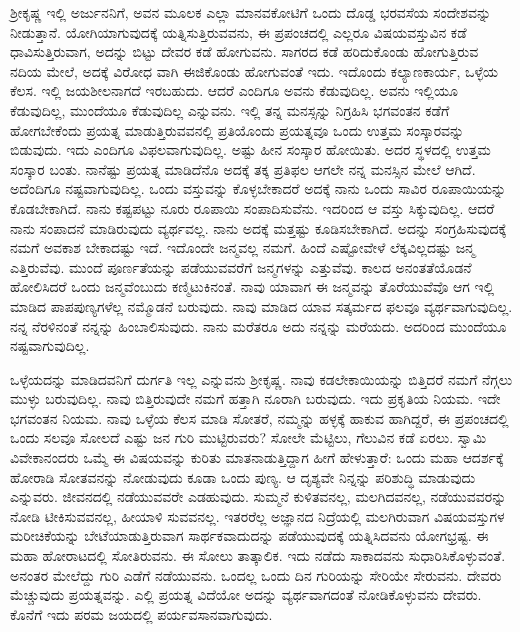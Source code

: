 ಶ್ರೀಕೃಷ್ಣ ಇಲ್ಲಿ ಅರ್ಜುನನಿಗೆ, ಅವನ ಮೂಲಕ ಎಲ್ಲಾ ಮಾನವಕೋಟಿಗೆ ಒಂದು ದೊಡ್ಡ ಭರವಸೆಯ ಸಂದೇಶವನ್ನು ನೀಡುತ್ತಾನೆ. ಯೋಗಿಯಾಗುವುದಕ್ಕೆ ಯತ್ನಿಸುತ್ತಿರುವವನು, ಈ ಪ್ರಪಂಚದಲ್ಲಿ ಎಲ್ಲರೂ ವಿಷಯವಸ್ತುವಿನ ಕಡೆ ಧಾವಿಸುತ್ತಿರುವಾಗ, ಅದನ್ನು ಬಿಟ್ಟು ದೇವರ ಕಡೆ ಹೋಗುವನು. ಸಾಗರದ ಕಡೆ ಹರಿದುಕೊಂಡು ಹೋಗುತ್ತಿರುವ ನದಿಯ ಮೇಲೆ, ಅದಕ್ಕೆ ವಿರೋಧ ವಾಗಿ ಈಜಿಕೊಂಡು ಹೋಗುವಂತೆ ಇದು. ಇದೊಂದು ಕಲ್ಯಾಣಕಾರ್ಯ, ಒಳ್ಳೆಯ ಕೆಲಸ. ಇಲ್ಲಿ ಜಯಶೀಲನಾಗದೆ ಇರಬಹುದು. ಆದರೆ ಎಂದಿಗೂ ಅವನು ಕೆಡುವುದಿಲ್ಲ. ಅವನು ಇಲ್ಲಿಯೂ ಕೆಡುವುದಿಲ್ಲ, ಮುಂದೆಯೂ ಕೆಡುವುದಿಲ್ಲ ಎನ್ನುವನು. ಇಲ್ಲಿ ತನ್ನ ಮನಸ್ಸನ್ನು ನಿಗ್ರಹಿಸಿ ಭಗವಂತನ ಕಡೆಗೆ ಹೋಗಬೇಕೆಂದು ಪ್ರಯತ್ನ ಮಾಡುತ್ತಿರುವವನಲ್ಲಿ ಪ್ರತಿಯೊಂದು ಪ್ರಯತ್ನವೂ ಒಂದು ಉತ್ತಮ ಸಂಸ್ಕಾರವನ್ನು ಬಿಡುವುದು. ಇದು ಎಂದಿಗೂ ವಿಫಲವಾಗುವುದಿಲ್ಲ. ಅಷ್ಟು ಹೀನ ಸಂಸ್ಕಾರ ಹೋಯಿತು. ಅದರ ಸ್ಥಳದಲ್ಲಿ ಉತ್ತಮ ಸಂಸ್ಕಾರ ಬಂತು. ನಾನೆಷ್ಟು ಪ್ರಯತ್ನ ಮಾಡಿದೆನೊ ಅದಕ್ಕೆ ತಕ್ಕ ಪ್ರತಿಫಲ ಆಗಲೇ ನನ್ನ ಮನಸ್ಸಿನ ಮೇಲೆ ಆಗಿದೆ. ಅದೆಂದಿಗೂ ನಷ್ಟವಾಗುವುದಿಲ್ಲ. ಒಂದು ವಸ್ತುವನ್ನು ಕೊಳ್ಳಬೇಕಾದರೆ ಅದಕ್ಕೆ ನಾನು ಒಂದು ಸಾವಿರ ರೂಪಾಯಿಯನ್ನು ಕೊಡಬೇಕಾಗಿದೆ. ನಾನು ಕಷ್ಟಪಟ್ಟು ನೂರು ರೂಪಾಯಿ ಸಂಪಾದಿಸುವೆನು. ಇದರಿಂದ ಆ ವಸ್ತು ಸಿಕ್ಕುವುದಿಲ್ಲ. ಆದರೆ ನಾನು ಸಂಪಾದನೆ ಮಾಡಿರುವುದು ವ್ಯರ್ಥವಲ್ಲ. ನಾನು ಅದಕ್ಕೆ ಮತ್ತಷ್ಟು ಕೂಡಿಸಬೇಕಾಗಿದೆ. ಅದನ್ನು ಸಂಗ್ರಹಿಸುವುದಕ್ಕೆ ನಮಗೆ ಅವಕಾಶ ಬೇಕಾದಷ್ಟು ಇದೆ. ಇದೊಂದೇ ಜನ್ಮವಲ್ಲ ನಮಗೆ. ಹಿಂದೆ ಎಷ್ಟೋವೇಳೆ ಲೆಕ್ಕವಿಲ್ಲದಷ್ಟು ಜನ್ಮ ಎತ್ತಿರುವೆವು. ಮುಂದೆ ಪೂರ್ಣತೆಯನ್ನು ಪಡೆಯುವವರೆಗೆ ಜನ್ಮಗಳನ್ನು ಎತ್ತುವೆವು. ಕಾಲದ ಅನಂತತೆಯೊಡನೆ ಹೋಲಿಸಿದರೆ ಒಂದು ಜನ್ಮವೆಂಬುದು ಕಣ್ಮಿಟುಕಿನಂತೆ. ನಾವು ಯಾವಾಗ ಈ ಜನ್ಮವನ್ನು ತೊರೆಯುವೆವೊ ಆಗ ಇಲ್ಲಿ ಮಾಡಿದ ಪಾಪಪುಣ್ಯಗಳೆಲ್ಲ ನಮ್ಮೊಡನೆ ಬರುವುದು. ನಾವು ಮಾಡಿದ ಯಾವ ಸತ್ಕರ್ಮದ ಫಲವೂ ವ್ಯರ್ಥವಾಗುವುದಿಲ್ಲ. ನನ್ನ ನೆರಳಿನಂತೆ ನನ್ನನ್ನು ಹಿಂಬಾಲಿಸುವುದು. ನಾನು ಮರೆತರೂ ಅದು ನನ್ನನ್ನು ಮರೆಯದು. ಅದರಿಂದ ಮುಂದೆಯೂ ನಷ್ಟವಾಗುವುದಿಲ್ಲ.

ಒಳ್ಳೆಯದನ್ನು ಮಾಡಿದವನಿಗೆ ದುರ್ಗತಿ ಇಲ್ಲ ಎನ್ನುವನು ಶ್ರೀಕೃಷ್ಣ. ನಾವು ಕಡಲೇಕಾಯಿಯನ್ನು ಬಿತ್ತಿದರೆ ನಮಗೆ ನೆಗ್ಗಲು ಮುಳ್ಳು ಬರುವುದಿಲ್ಲ. ನಾವು ಬಿತ್ತಿರುವುದೇ ನಮಗೆ ಹತ್ತಾಗಿ ನೂರಾಗಿ ಬರುವುದು. ಇದು ಪ್ರಕೃತಿಯ ನಿಯಮ. ಇದೇ ಭಗವಂತನ ನಿಯಮ. ನಾವು ಒಳ್ಳೆಯ ಕೆಲಸ ಮಾಡಿ ಸೋತರೆ, ನಮ್ಮನ್ನು ಹಳ್ಳಕ್ಕೆ ಹಾಕುವ ಹಾಗಿದ್ದರೆ, ಈ ಪ್ರಪಂಚದಲ್ಲಿ ಒಂದು ಸಲವೂ ಸೋಲದೆ ಎಷ್ಟು ಜನ ಗುರಿ ಮುಟ್ಟಿರುವರು? ಸೋಲೇ ಮೆಟ್ಟಿಲು, ಗೆಲುವಿನ ಕಡೆ ಏರಲು. ಸ್ವಾಮಿ ವಿವೇಕಾನಂದರು ಒಮ್ಮೆ ಈ ವಿಷಯವನ್ನು ಕುರಿತು ಮಾತನಾಡುತ್ತಿದ್ದಾಗ ಹೀಗೆ ಹೇಳುತ್ತಾರೆ: ಒಂದು ಮಹಾ ಆದರ್ಶಕ್ಕೆ ಹೋರಾಡಿ ಸೋತವನನ್ನು ನೋಡುವುದು ಕೂಡಾ ಒಂದು ಪುಣ್ಯ. ಆ ದೃಶ್ಯವೇ ನಿನ್ನನ್ನು ಪರಿಶುದ್ಧಿ ಮಾಡುವುದು ಎನ್ನುವರು. ಜೀವನದಲ್ಲಿ ನಡೆಯುವವರೇ ಎಡಹುವುದು. ಸುಮ್ಮನೆ ಕುಳಿತವನಲ್ಲ, ಮಲಗಿದವನಲ್ಲ, ನಡೆಯುವವರನ್ನು ನೋಡಿ ಟೀಕಿಸುವವನಲ್ಲ, ಹೀಯಾಳಿ ಸುವವನಲ್ಲ. ಇತರರೆಲ್ಲ ಅಜ್ಞಾನದ ನಿದ್ರೆಯಲ್ಲಿ ಮಲಗಿರುವಾಗ ವಿಷಯವಸ್ತುಗಳ ಮರೀಚಿಕೆಯನ್ನು ಬೇಟೆಯಾಡುತ್ತಿರುವಾಗ ಸಾರ್ಥಕವಾದುದನ್ನು ಪಡೆಯುವುದಕ್ಕೆ ಯತ್ನಿಸಿದವನು ಯೋಗಭ್ರಷ್ಟ. ಈ ಮಹಾ ಹೋರಾಟದಲ್ಲಿ ಸೋತಿರುವನು. ಈ ಸೋಲು ತಾತ್ಕಾಲಿಕ. ಇದು ನಡೆದು ಸಾಕಾದವನು ಸುಧಾರಿಸಿಕೊಳ್ಳುವಂತೆ. ಅನಂತರ ಮೇಲೆದ್ದು ಗುರಿ ಎಡೆಗೆ ನಡೆಯುವನು. ಒಂದಲ್ಲ ಒಂದು ದಿನ ಗುರಿಯನ್ನು ಸೇರಿಯೇ ಸೇರುವನು. ದೇವರು ಮೆಚ್ಚುವುದು ಪ್ರಯತ್ನವನ್ನು. ಎಲ್ಲಿ ಪ್ರಯತ್ನ ವಿದೆಯೋ ಅದನ್ನು ವ್ಯರ್ಥವಾಗದಂತೆ ನೋಡಿಕೊಳ್ಳುವನು ದೇವರು. ಕೊನೆಗೆ ಇದು ಪರಮ ಜಯದಲ್ಲಿ ಪರ್ಯವಸಾನವಾಗುವುದು.


